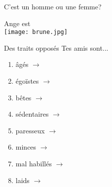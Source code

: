 \documentclass{beamer}
\begin{document}
  \begin{frame}{C'est un homme ou une femme?}
    \begin{center}
      Ange est \underline{} \\
      \texttt{[image: brune.jpg]}
    \end{center}
  \end{frame}

  \begin{frame}{Des traits opposés}
    Tes amis sont...
    \begin{enumerate}
      \item âgés $\to$ \underline{}
      \item égoïstes $\to$ \underline{}
      \item bêtes $\to$ \underline{}
      \item sédentaires $\to$ \underline{}
      \item paresseux $\to$ \underline{}
      \item minces $\to$ \underline{}
      \item mal habillés $\to$ \underline{}
      \item laids $\to$ \underline{}
    \end{enumerate}
  \end{frame}
\end{document}
